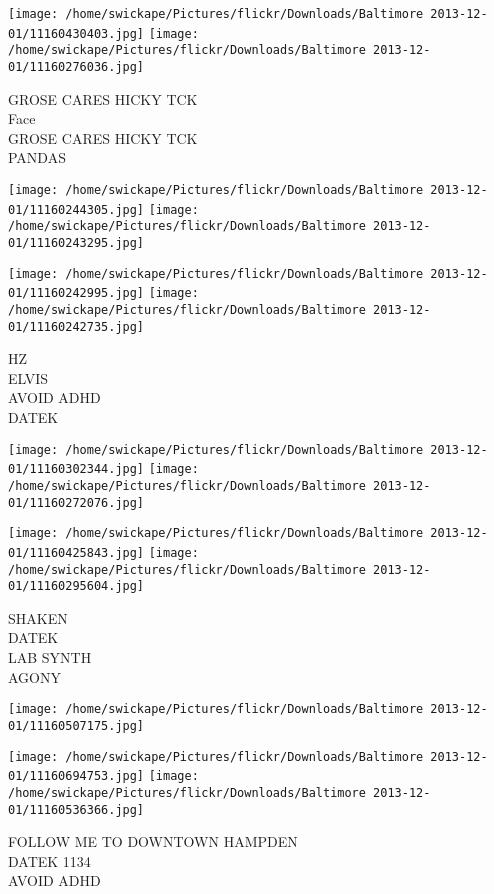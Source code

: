 \documentclass[10pt,letterpaper]{article}
\begin{document}
\texttt{[image: /home/swickape/Pictures/flickr/Downloads/Baltimore 2013-12-01/11160430403.jpg]}
\texttt{[image: /home/swickape/Pictures/flickr/Downloads/Baltimore 2013-12-01/11160276036.jpg]}

GROSE CARES HICKY TCK\\
Face\\
GROSE CARES HICKY TCK\\
PANDAS
\pagebreak

\texttt{[image: /home/swickape/Pictures/flickr/Downloads/Baltimore 2013-12-01/11160244305.jpg]}
\texttt{[image: /home/swickape/Pictures/flickr/Downloads/Baltimore 2013-12-01/11160243295.jpg]}

\texttt{[image: /home/swickape/Pictures/flickr/Downloads/Baltimore 2013-12-01/11160242995.jpg]}
\texttt{[image: /home/swickape/Pictures/flickr/Downloads/Baltimore 2013-12-01/11160242735.jpg]}

HZ\\
ELVIS\\
AVOID ADHD\\
DATEK
\pagebreak

\texttt{[image: /home/swickape/Pictures/flickr/Downloads/Baltimore 2013-12-01/11160302344.jpg]}
\texttt{[image: /home/swickape/Pictures/flickr/Downloads/Baltimore 2013-12-01/11160272076.jpg]}

\texttt{[image: /home/swickape/Pictures/flickr/Downloads/Baltimore 2013-12-01/11160425843.jpg]}
\texttt{[image: /home/swickape/Pictures/flickr/Downloads/Baltimore 2013-12-01/11160295604.jpg]}

SHAKEN\\
DATEK\\
LAB SYNTH\\
AGONY
\pagebreak

\texttt{[image: /home/swickape/Pictures/flickr/Downloads/Baltimore 2013-12-01/11160507175.jpg]}

\vspace{0.25in}
\texttt{[image: /home/swickape/Pictures/flickr/Downloads/Baltimore 2013-12-01/11160694753.jpg]}
\texttt{[image: /home/swickape/Pictures/flickr/Downloads/Baltimore 2013-12-01/11160536366.jpg]}

FOLLOW ME TO DOWNTOWN HAMPDEN\\
DATEK 1134\\
AVOID ADHD
\pagebreak
\end{document}
